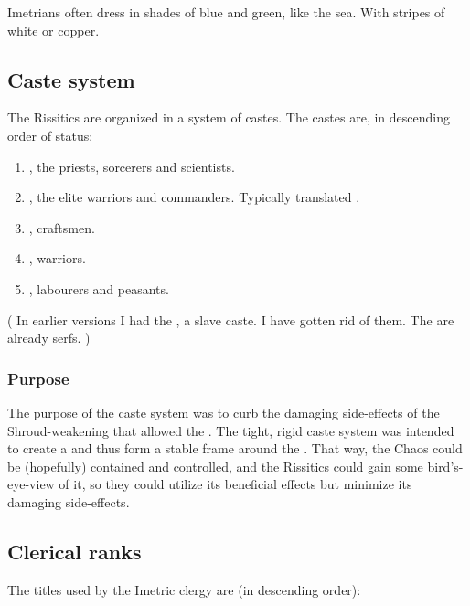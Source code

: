 Imetrians often dress in shades of blue and green, like the sea. 
With stripes of white or copper.









\subsection{Caste system}
The Rissitics are organized in a system of castes.
The castes are, in descending order of status:

\begin{enumerate}
  \item \Nyzlet, the priests, sorcerers and scientists.
  \item \Reken, the elite warriors and commanders. 
    Typically translated . 
  \item \Bedhin, craftsmen.
  \item \Kyth, warriors. 
  \item \Hok, labourers and peasants.
\end{enumerate}

(%
  In earlier versions I had the , a slave caste. 
  I have gotten rid of them. 
  The \hok{} are already serfs.%
)






\subsubsection{Purpose}
The purpose of the caste system was to curb the damaging side-effects of the Shroud-weakening that allowed the . 
The tight, rigid caste system was intended to create a  and thus form a stable frame around the . 
That way, the Chaos could be (hopefully) contained and controlled, and the Rissitics could gain some bird's-eye-view of it, so they could utilize its beneficial effects but minimize its damaging side-effects. 





\subsection{Clerical ranks}
The titles used by the Imetric clergy are (in descending order): 

